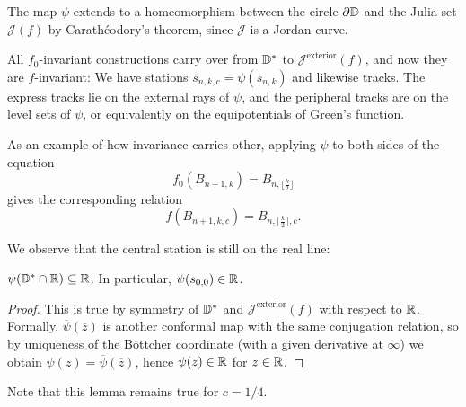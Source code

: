 The map $\psi$ extends to a homeomorphism between the circle
$\partial\mathbb{D}$ and the Julia set $\mathcal{J}(f)$ by Carathéodory's
theorem, since $\mathcal{J}$ is a Jordan curve.

All $f_{0}$-invariant constructions carry over from $\mathbb{D}^{*}$ to
$\mathcal{J}^{\text{exterior}}(f)$, and now they are $f$-invariant:
We have stations $s_{n,k,c}=\psi(s_{n,k})$ and likewise tracks.
The express tracks lie on the external rays of $\psi$, and the
peripheral tracks are on the level sets of $\psi$, or equivalently
on the equipotentials of Green's function.

As an example of how invariance carries other, applying $\psi$
to both sides of the equation 
\[
f_{0}\left(B_{n+1,k}\right)=B_{n,\lfloor\frac{k}{2}\rfloor}
\]
gives the corresponding relation 
\[
f\left(B_{n+1,k,c}\right)=B_{n,\lfloor\frac{k}{2}\rfloor,c}.
\]

We observe that the central station is still on the real line:

\begin{lemma}$\psi(\mathbb{D}^{*}\cap\mathbb{R})\subseteq\mathbb{R}$. In particular,
$\psi(s_{0,0})\in\mathbb{R}$.
\end{lemma}
\begin{proof}
This is true by symmetry of $\mathbb{D}^{*}$ and $\mathcal{J}^{\text{exterior}}(f)$
with respect to $\mathbb{R}$. Formally, $\overline{\psi}(\overline{z})$
is another conformal map with the same conjugation relation, so by
uniqueness of the Böttcher coordinate (with a given derivative at
$\infty$) we obtain $\psi(z)=\overline{\psi}(\overline{z})$,
hence $\psi(z)\in\mathbb{R}$ for $z\in\mathbb{R}$.
\end{proof}
Note that this lemma remains true for $c=1/4$.

\begin{comment}
$c=0.1\in(\frac{-3}{4},\frac{1}{4})$
\end{comment}

\begin{comment}
We explain the proof in the easier setting in which $f$ is inside
the main cardioid, e.g. $c\in\left(-\frac{3}{4},\frac{1}{4}\right)$. 
\end{comment}

\begin{comment}
We suppress the index $c$ at times. 
\end{comment}

